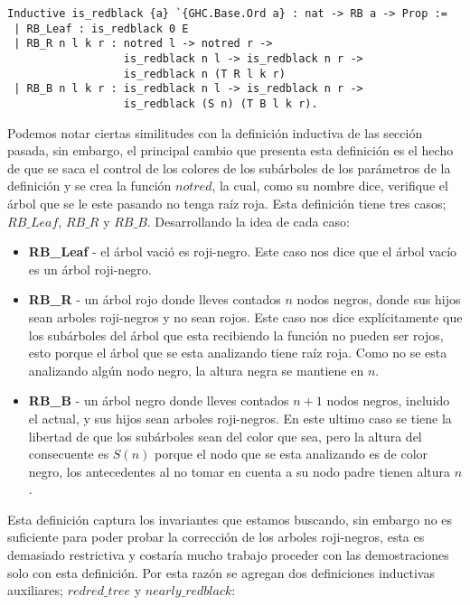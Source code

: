 \documentclass[letterpaper,12pt,oneside]{book}
\newcommand{\arn}{árbol roji-negro}
\newcommand{\arns}{arboles roji-negros}
\theoremstyle{plain}
\theoremstyle{definition}
\theoremstyle{remark}
\begin{document}
\begin{verbatim}
Inductive is_redblack {a} `{GHC.Base.Ord a} : nat -> RB a -> Prop :=
 | RB_Leaf : is_redblack 0 E
 | RB_R n l k r : notred l -> notred r ->
                  is_redblack n l -> is_redblack n r ->
                  is_redblack n (T R l k r)
 | RB_B n l k r : is_redblack n l -> is_redblack n r ->
                  is_redblack (S n) (T B l k r).
\end{verbatim}

Podemos notar ciertas similitudes con la definición inductiva de las secci\'on pasada, sin embargo, el 
principal cambio que presenta esta definición es el hecho de que se saca el control de los colores de los
subárboles de los parámetros de la definici\'on y se crea la funci\'on $notred$, la cual, como su nombre 
dice, verifique el \'arbol que se le este pasando no tenga raíz roja. Esta definici\'on tiene tres casos;
$RB\_Leaf$, $RB\_R$ y $RB\_B$. Desarrollando la idea de cada caso:

\begin{itemize}
        \item \textbf{RB\_Leaf} - el árbol vació es roji-negro. Este caso nos dice que el \'arbol vacío 
        es un {\arn}.
        \item \textbf{RB\_R} - un árbol rojo donde lleves contados $n$ nodos negros, donde sus hijos sean
        {\arns} y no sean rojos. Este caso nos dice explícitamente que los subárboles del árbol que esta 
        recibiendo la función no pueden ser rojos, esto porque el árbol que se esta analizando tiene raíz
        roja. Como no se esta analizando algún nodo negro, la altura negra se mantiene en $n$.
        \item \textbf{RB\_B} - un árbol negro donde lleves contados $n+1$ nodos negros, incluido el 
        actual, y sus hijos sean {\arns}. En este ultimo caso se tiene la libertad de que los subárboles 
        sean del color que sea, pero la altura del consecuente es $S(n)$ porque el nodo que se esta 
        analizando es de color negro, los antecedentes al no tomar en cuenta a su nodo padre tienen 
        altura $n$.
\end{itemize}

Esta definici\'on captura los invariantes que estamos buscando, sin embargo no es suficiente para poder 
probar la correcci\'on de los {\arns}, esta es demasiado restrictiva y costaría mucho trabajo proceder con las
demostraciones solo con esta definici\'on. Por esta razón se agregan dos definiciones inductivas auxiliares; 
$redred\_tree$ y $nearly\_redblack$: 
\end{document}
